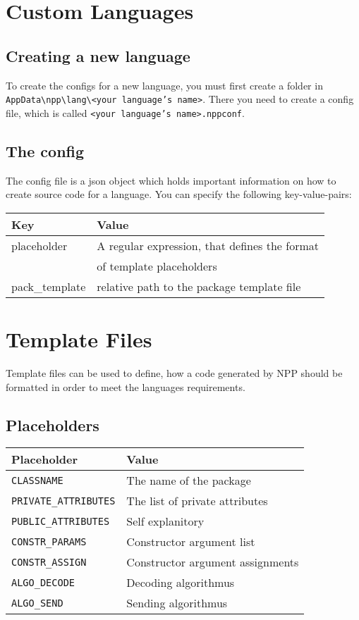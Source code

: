 \documentclass[a4paper, 11pt]{article}
\def\code#1{\texttt{#1}}
\begin{document}
\section{Custom Languages}
	\subsection{Creating a new language}
		To create the configs for a new language, you must first create a folder in \code{AppData\textbackslash npp\textbackslash lang\textbackslash <your language's name>}. There you need to create a config file, which is called \code {<your language's name>.nppconf}.
		
	\subsection{The config}
		The config file is a json object which holds important information on how to create source code for a language. You can specify the following key-value-pairs: \\
		
		\begin{tabular}{l|l}
			Key & Value \\
			\hline
			placeholder & A regular expression, that defines the format \\
			            & of template placeholders \\
			pack\_template & relative path to the package template file \\
		\end{tabular}

\section{Template Files}
	Template files can be used to define, how a code generated by NPP should be formatted in order to meet the languages requirements.

	\subsection{Placeholders}
	\begin{tabular}{l|l}
			Placeholder & Value \\
			\hline
			\code{CLASSNAME} & The name of the package \\
			\code{PRIVATE\_ATTRIBUTES} & The list of private attributes \\
			\code{PUBLIC\_ATTRIBUTES} & Self explanitory \\
			\code{CONSTR\_PARAMS} & Constructor argument list \\
			\code{CONSTR\_ASSIGN} & Constructor argument assignments \\
			\code{ALGO\_DECODE} & Decoding algorithmus \\
			\code{ALGO\_SEND} & Sending algorithmus \\
		\end{tabular}
 
\end{document}
